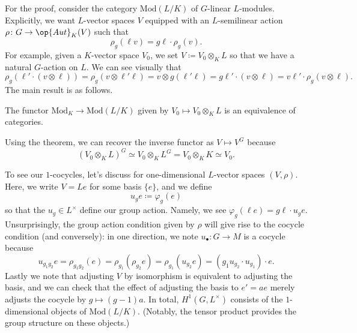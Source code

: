 \documentclass[../notes.tex]{subfiles}
\begin{document}
For the proof, consider the category $\mathrm{Mod}(L/K)$ of $G$-linear $L$-modules. Explicitly, we want $L$-vector spaces $V$ equipped with an $L$-semilinear action $\rho\colon G\to\op{Aut}_K(V)$ such that
\[\rho_g(\ell v)=g\ell\cdot\rho_g(v).\]
For example, given a $K$-vector space $V_0$, we set $V\coloneqq V_0\otimes_KL$ so that we have a natural $G$-action on $L$. We can see visually that
\[\rho_g(\ell'\cdot(v\otimes\ell))=\rho_g(v\otimes\ell'\ell)=v\otimes g(\ell'\ell)=g\ell'\cdot(v\otimes\ell)=v\ell'\cdot\rho_g(v\otimes\ell).\]
The main result is as follows.
\begin{theorem} \label{thm:easy-descent}
	The functor $\mathrm{Mod}_K\to\mathrm{Mod}(L/K)$ given by $V_0\mapsto V_0\otimes_KL$ is an equivalence of categories.
\end{theorem}
\begin{remark}
	Using the theorem, we can recover the inverse functor as $V\mapsto V^G$ because
	\[(V_0\otimes_KL)^G\simeq V_0\otimes_KL^G=V_0\otimes_KK\simeq V_0.\]
\end{remark}
To see our $1$-cocycles, let's discuss  for one-dimensional $L$-vector spaces $(V,\rho)$. Here, we write $V=Le$ for some basis $\{e\}$, and we define
\[u_ge\coloneqq\varphi_g(e)\]
so that the $u_g\in L^\times$ define our group action. Namely, we see $\varphi_g(\ell e)=g\ell\cdot u_ge$. Unsurprisingly, the group action condition given by $\rho$ will give rise to the cocycle condition (and conversely): in one direction, we note $u_\bullet\colon G\to M$ is a cocycle because
\[u_{g_1g_2}e=\rho_{g_1g_2}(e)=\rho_{g_1}(\rho_{g_2}e)=\rho_{g_1}(u_{g_2}e)=\left(g_1u_{g_2}\cdot u_{g_1}\right)\cdot e.\]
Lastly we note that adjusting $V$ by isomorphism is equivalent to adjusting the basis, and we can check that the effect of adjusting the basis to $e'=ae$ merely adjusts the cocycle by $g\mapsto(g-1)a$. In total, $H^1(G,L^\times)$ consists of the $1$-dimensional objects of $\mathrm{Mod}(L/K)$. (Notably, the tensor product provides the group structure on these objects.)
\end{document}
